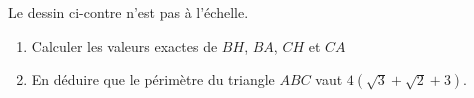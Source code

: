 
\begin{exercice}%
    \label{exosmath-0445}

    \begin{center}
   
    \end{center}

Le dessin ci-contre n'est pas à l'échelle.
\begin{enumerate}
    \item
Calculer les valeurs exactes de $BH$, $BA$, $CH$ et $CA$
\item
    En déduire que le périmètre du triangle \( ABC\) vaut \( 4(\sqrt{3}+\sqrt{2}+3)\).
\end{enumerate}

\end{exercice}
